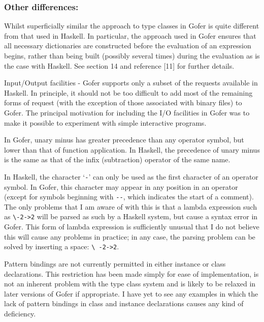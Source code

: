 \subsubsection*{Other differences:}
\BI
\IT  Whilst superficially similar the approach to type classes in Gofer
     is quite different from that used in Haskell.  In particular,  the
     approach used in Gofer ensures that all necessary dictionaries are
     constructed before the evaluation of an expression begins,  rather
     than being built (possibly several times) during the evaluation as
     is the case with Haskell.  See section 14 and reference  [11]  for
     further details.

\IT  Input/Output facilities - Gofer supports  only  a  subset  of  the
     requests available in Haskell.  In principle, it should not be too
     difficult to add most of the remaining forms of request (with  the
     exception of those associated with binary files)  to  Gofer.   The
     principal motivation for including the I/O facilities in Gofer was
     to  make  it  possible  to  experiment  with  simple   interactive
     programs.

\IT  In Gofer, unary minus has greater  precedence  than  any  operator
     symbol, but lower than that of function application.  In  Haskell,
     the precedence of unary minus is the same as  that  of  the  infix
     (subtraction) operator of the same name.

\IT  In Haskell, the character `\verb"-"'  can  only  be  used  as  the  first
     character of an operator symbol.  In  Gofer,  this  character  may
     appear  in  any  position  in  an  operator  (except  for  symbols
     beginning with \verb"--", which indicates the start of a comment).  The
     only problems that I am aware  of  with  this  is  that  a  lambda
     expression such as \verb"\-2->2" will be parsed as such  by  a  Haskell
     system, but cause a syntax error in Gofer.  This  form  of  lambda
     expression is sufficiently unusual that I do not believe this will
     cause any problems in practice; in any case, the  parsing  problem
     can be solved by inserting a space: \verb"\ -2->2".

\IT  Pattern bindings are not currently permitted in either instance or
     class declarations.  This restriction has  been  made  simply  for
     ease of implementation, is not an inherent problem with  the  type
     class system and is likely to be  relaxed  in  later  versions  of
     Gofer if appropriate.  I have yet to see any examples in which the
     lack of pattern bindings in class and instance declarations causes
     any kind of deficiency.

